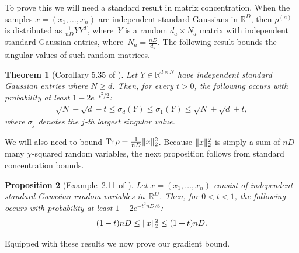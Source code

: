 \documentclass[aos]{imsart}
\newtheorem{theorem}{Theorem}[section]
\newtheorem{prop}[theorem]{Proposition}
\theoremstyle{definition}
\numberwithin{equation}{section}
\DeclareMathOperator{\tr}{Tr}
\DeclarePairedDelimiter{\norm}{\lVert}{\rVert}
\newcommand{\R}{{\mathbb{R}}}
\newcommand{\rv}{x}
\begin{document}
To prove this we will need a standard result in matrix concentration.
When the samples $x=(x_1,\dots,x_n)$ are independent standard Gaussians in $\R^D$, then $\rho^{(a)}$ is distributed as $\frac1{nD} Y Y^T$, where~$Y$ is a random $d_a \times N_a$ matrix with independent standard Gaussian entries, where~$N_a = \frac{nD}{d_a}$.
The following result bounds the singular values of such random matrices.

\begin{theorem}[Corollary 5.35 of \cite{vershynin2010introduction}]\label{cor:vershynin}
Let $Y \in \R^{d \times N}$ have independent standard Gaussian entries where $N\geq d$.
Then, for every $t > 0$, the following occurs with probability at least $1 - 2 e^{-t^2/2}$:
\begin{align*}
  \sqrt{N} - \sqrt{d} - t \leq \sigma_d(Y) \leq \sigma_1(Y) \leq \sqrt{N} + \sqrt{d} + t,
\end{align*}
where $\sigma_j$ denotes the $j$-th largest singular value.
\end{theorem}

We will also need to bound $\tr\rho = \frac1{nD} \norm x_2^2$.
Because $\norm x_2^2$ is simply a sum of $nD$ many $\chi$-squared random variables, the next proposition follows from standard concentration bounds.

\begin{prop}[Example~2.11 of \cite{W19}]\label{prp:xnorm}
Let $\rv = (\rv_1,\dots,\rv_n)$ consist of independent standard Gaussian random variables in~$\R^D$.
Then, for $0 < t < 1$, the following occurs with probability at least $1 - 2e^{-t^2 nD/8}$:
\begin{align*}
  (1 - t) nD \leq \norm{x}_2^2 \leq (1 + t) nD.
\end{align*}
\end{prop}

Equipped with these results we now prove our gradient bound.
\end{document}
